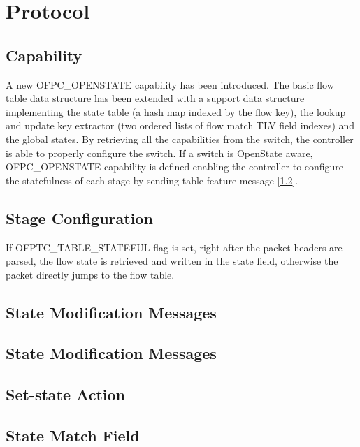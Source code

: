 
\chapter{Protocol}
\label{chap:protocol}

\section{Capability}
\label{sec:capability}
A new OFPC\_OPENSTATE capability has been introduced.
The basic flow table data structure has been extended with a support data structure implementing the state table (a hash map indexed by the flow key), the lookup and update key extractor (two ordered lists of flow match TLV field indexes) and the global states.
By retrieving all the capabilities from the switch, the controller is able to properly configure the switch. If a switch is OpenState aware, OFPC\_OPENSTATE capability is defined enabling the controller to configure the statefulness of each stage by sending table feature message [\ref{sec:table_conf}].

\section{Stage Configuration}
\label{sec:table_conf}
If OFPTC\_TABLE\_STATEFUL flag is set, right after the packet headers are parsed, the flow state is retrieved and written in the state field, otherwise the packet directly jumps to the flow table. 

\section{State Modification Messages}

\section{State Modification Messages}

\section{Set-state Action}

\section{State Match Field}